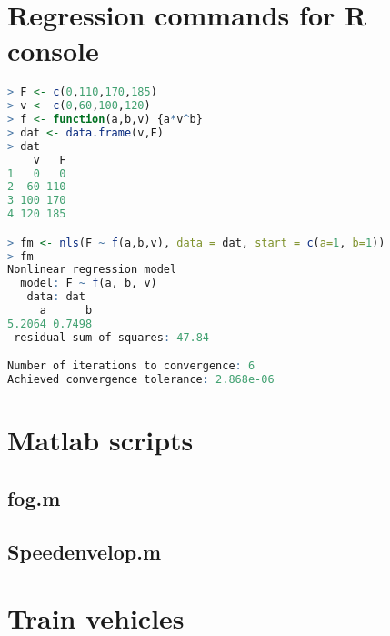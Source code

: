 \begin{appendices}
\chapter{Regression commands for R console}\label{sec:Rregression}

\begin{lstlisting}[keywordstyle=\bfseries\color{blue},language=R]
> F <- c(0,110,170,185)
> v <- c(0,60,100,120)
> f <- function(a,b,v) {a*v^b}
> dat <- data.frame(v,F)
> dat
    v   F
1   0   0
2  60 110
3 100 170
4 120 185

> fm <- nls(F ~ f(a,b,v), data = dat, start = c(a=1, b=1))
> fm
Nonlinear regression model
  model: F ~ f(a, b, v)
   data: dat
     a      b 
5.2064 0.7498 
 residual sum-of-squares: 47.84

Number of iterations to convergence: 6 
Achieved convergence tolerance: 2.868e-06
\end{lstlisting}

\chapter{Matlab scripts}\label{sec:matlabscripts}
\section{fog.m}

\section{Speedenvelop.m}

% 
% 
% 


\chapter{Train vehicles}


\end{appendices}
